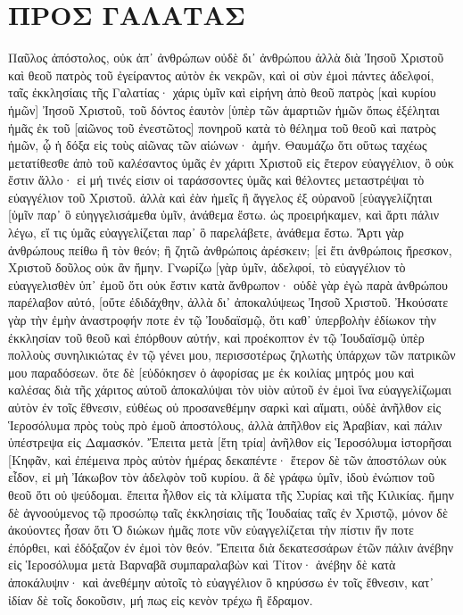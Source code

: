 \section{ΠΡΟΣ ΓΑΛΑΤΑΣ}
Παῦλος ἀπόστολος, οὐκ ἀπ᾽ ἀνθρώπων οὐδὲ δι᾽ ἀνθρώπου ἀλλὰ διὰ Ἰησοῦ Χριστοῦ καὶ θεοῦ πατρὸς τοῦ ἐγείραντος αὐτὸν ἐκ νεκρῶν, 
καὶ οἱ σὺν ἐμοὶ πάντες ἀδελφοί, ταῖς ἐκκλησίαις τῆς Γαλατίας· 
χάρις ὑμῖν καὶ εἰρήνη ἀπὸ θεοῦ πατρὸς [καὶ κυρίου ἡμῶν] Ἰησοῦ Χριστοῦ, 
τοῦ δόντος ἑαυτὸν [ὑπὲρ τῶν ἁμαρτιῶν ἡμῶν ὅπως ἐξέληται ἡμᾶς ἐκ τοῦ [αἰῶνος τοῦ ἐνεστῶτος] πονηροῦ κατὰ τὸ θέλημα τοῦ θεοῦ καὶ πατρὸς ἡμῶν, 
ᾧ ἡ δόξα εἰς τοὺς αἰῶνας τῶν αἰώνων· ἀμήν. 
Θαυμάζω ὅτι οὕτως ταχέως μετατίθεσθε ἀπὸ τοῦ καλέσαντος ὑμᾶς ἐν χάριτι Χριστοῦ εἰς ἕτερον εὐαγγέλιον, 
ὃ οὐκ ἔστιν ἄλλο· εἰ μή τινές εἰσιν οἱ ταράσσοντες ὑμᾶς καὶ θέλοντες μεταστρέψαι τὸ εὐαγγέλιον τοῦ Χριστοῦ. 
ἀλλὰ καὶ ἐὰν ἡμεῖς ἢ ἄγγελος ἐξ οὐρανοῦ [εὐαγγελίζηται [ὑμῖν παρ᾽ ὃ εὐηγγελισάμεθα ὑμῖν, ἀνάθεμα ἔστω. 
ὡς προειρήκαμεν, καὶ ἄρτι πάλιν λέγω, εἴ τις ὑμᾶς εὐαγγελίζεται παρ᾽ ὃ παρελάβετε, ἀνάθεμα ἔστω. 
Ἄρτι γὰρ ἀνθρώπους πείθω ἢ τὸν θεόν; ἢ ζητῶ ἀνθρώποις ἀρέσκειν; [εἰ ἔτι ἀνθρώποις ἤρεσκον, Χριστοῦ δοῦλος οὐκ ἂν ἤμην. 
Γνωρίζω [γὰρ ὑμῖν, ἀδελφοί, τὸ εὐαγγέλιον τὸ εὐαγγελισθὲν ὑπ᾽ ἐμοῦ ὅτι οὐκ ἔστιν κατὰ ἄνθρωπον· 
οὐδὲ γὰρ ἐγὼ παρὰ ἀνθρώπου παρέλαβον αὐτό, [οὔτε ἐδιδάχθην, ἀλλὰ δι᾽ ἀποκαλύψεως Ἰησοῦ Χριστοῦ. 
Ἠκούσατε γὰρ τὴν ἐμὴν ἀναστροφήν ποτε ἐν τῷ Ἰουδαϊσμῷ, ὅτι καθ᾽ ὑπερβολὴν ἐδίωκον τὴν ἐκκλησίαν τοῦ θεοῦ καὶ ἐπόρθουν αὐτήν, 
καὶ προέκοπτον ἐν τῷ Ἰουδαϊσμῷ ὑπὲρ πολλοὺς συνηλικιώτας ἐν τῷ γένει μου, περισσοτέρως ζηλωτὴς ὑπάρχων τῶν πατρικῶν μου παραδόσεων. 
ὅτε δὲ [εὐδόκησεν ὁ ἀφορίσας με ἐκ κοιλίας μητρός μου καὶ καλέσας διὰ τῆς χάριτος αὐτοῦ 
ἀποκαλύψαι τὸν υἱὸν αὐτοῦ ἐν ἐμοὶ ἵνα εὐαγγελίζωμαι αὐτὸν ἐν τοῖς ἔθνεσιν, εὐθέως οὐ προσανεθέμην σαρκὶ καὶ αἵματι, 
οὐδὲ ἀνῆλθον εἰς Ἱεροσόλυμα πρὸς τοὺς πρὸ ἐμοῦ ἀποστόλους, ἀλλὰ ἀπῆλθον εἰς Ἀραβίαν, καὶ πάλιν ὑπέστρεψα εἰς Δαμασκόν. 
Ἔπειτα μετὰ [ἔτη τρία] ἀνῆλθον εἰς Ἱεροσόλυμα ἱστορῆσαι [Κηφᾶν, καὶ ἐπέμεινα πρὸς αὐτὸν ἡμέρας δεκαπέντε· 
ἕτερον δὲ τῶν ἀποστόλων οὐκ εἶδον, εἰ μὴ Ἰάκωβον τὸν ἀδελφὸν τοῦ κυρίου. 
ἃ δὲ γράφω ὑμῖν, ἰδοὺ ἐνώπιον τοῦ θεοῦ ὅτι οὐ ψεύδομαι. 
ἔπειτα ἦλθον εἰς τὰ κλίματα τῆς Συρίας καὶ τῆς Κιλικίας. 
ἤμην δὲ ἀγνοούμενος τῷ προσώπῳ ταῖς ἐκκλησίαις τῆς Ἰουδαίας ταῖς ἐν Χριστῷ, 
μόνον δὲ ἀκούοντες ἦσαν ὅτι Ὁ διώκων ἡμᾶς ποτε νῦν εὐαγγελίζεται τὴν πίστιν ἥν ποτε ἐπόρθει, 
καὶ ἐδόξαζον ἐν ἐμοὶ τὸν θεόν. 
Ἔπειτα διὰ δεκατεσσάρων ἐτῶν πάλιν ἀνέβην εἰς Ἱεροσόλυμα μετὰ Βαρναβᾶ συμπαραλαβὼν καὶ Τίτον· 
ἀνέβην δὲ κατὰ ἀποκάλυψιν· καὶ ἀνεθέμην αὐτοῖς τὸ εὐαγγέλιον ὃ κηρύσσω ἐν τοῖς ἔθνεσιν, κατ᾽ ἰδίαν δὲ τοῖς δοκοῦσιν, μή πως εἰς κενὸν τρέχω ἢ ἔδραμον. 
